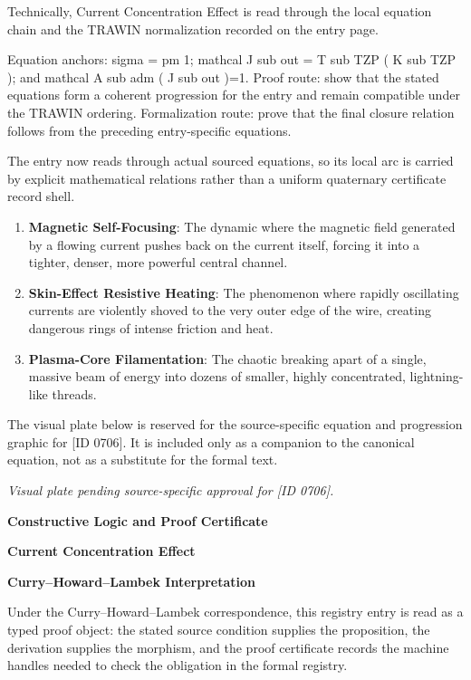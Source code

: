 Technically, Current Concentration Effect is read through the local equation chain and the TRAWIN normalization recorded on the entry page.

Equation anchors: sigma = pm 1; mathcal J sub out = T sub TZP ( K sub TZP ); and mathcal A sub adm ( J sub out )=1. Proof route: show that the stated equations form a coherent progression for the entry and remain compatible under the TRAWIN ordering. Formalization route: prove that the final closure relation follows from the preceding entry-specific equations.

The entry now reads through actual sourced equations, so its local arc is carried by explicit mathematical relations rather than a uniform quaternary certificate record shell.
\endgroup

\begin{enumerate}[leftmargin=1.6em,itemsep=6pt,topsep=4pt]
\item \textbf{Magnetic Self-Focusing}: The dynamic where the magnetic field generated by a flowing current pushes back on the current itself, forcing it into a tighter, denser, more powerful central channel.
\item \textbf{Skin-Effect Resistive Heating}: The phenomenon where rapidly oscillating currents are violently shoved to the very outer edge of the wire, creating dangerous rings of intense friction and heat.
\item \textbf{Plasma-Core Filamentation}: The chaotic breaking apart of a single, massive beam of energy into dozens of smaller, highly concentrated, lightning-like threads.
\end{enumerate}

\begingroup\footnotesize\sloppy
The visual plate below is reserved for the source-specific equation and progression graphic for [ID 0706]. It is included only as a companion to the canonical equation, not as a substitute for the formal text.
\par\endgroup
\begingroup\footnotesize\itshape
Visual plate pending source-specific approval for [ID 0706].
\par\endgroup

\clearpage
\begingroup\tzpsupportsetup
\noindent\textbf{\fontsize{10.8pt}{12.8pt}\selectfont [ID 0706] Constructive Logic and Proof Certificate}\par
\noindent\textbf{\fontsize{10pt}{12pt}\selectfont Current Concentration Effect}\par
\vspace{0.45em}
\begingroup
\footnotesize
\setlength{\parskip}{0.22em}
\setlength{\parindent}{0pt}
\noindent\textbf{Curry--Howard--Lambek Interpretation}\par
Under the Curry--Howard--Lambek correspondence, this registry entry is read as a typed proof
object: the stated source condition supplies the proposition, the derivation supplies the
morphism, and the proof certificate records the machine handles needed to check the obligation
in the formal registry.

